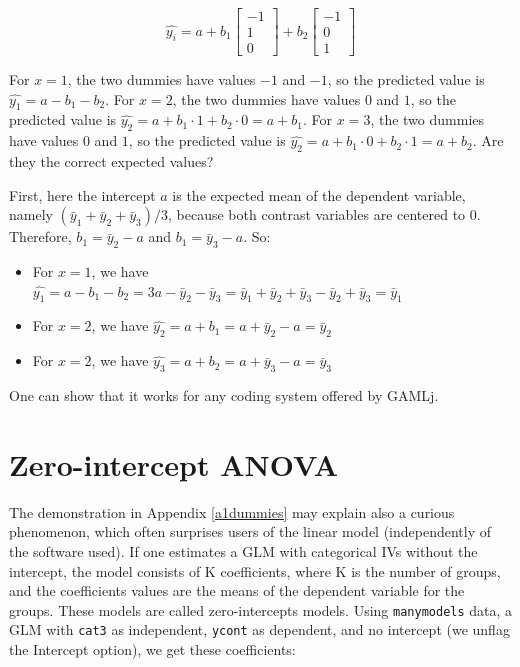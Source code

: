 \documentclass[
]{book}
\providecommand{\tightlist}{%
  \setlength{\itemsep}{0pt}\setlength{\parskip}{0pt}}
\begin{document}
\[
\hat{y_i}=a+b_1 \begin{bmatrix}
-1 \\
1 \\
0
\end{bmatrix} +b_2 \begin{bmatrix}
-1 \\
0 \\
1
\end{bmatrix}
\]

For \(x=1\), the two dummies have values \(-1\) and \(-1\), so the predicted value is \(\hat{y_1}=a-b_1-b_2\). For \(x=2\), the two dummies have values \(0\) and \(1\), so the predicted value is \(\hat{y_2}=a+b_1 \cdot 1 +b_2 \cdot 0 =a+b_1\). For \(x=3\), the two dummies have values \(0\) and \(1\), so the predicted value is \(\hat{y_2}=a+b_1 \cdot 0 +b_2 \cdot 1 =a+b_2\). Are they the correct expected values?

First, here the intercept \(a\) is the expected mean of the dependent variable, namely \((\bar{y}_1+\bar{y}_2+\bar{y}_3)/3\), because both contrast variables are centered to 0. Therefore, \(b_1=\bar{y}_2-a\) and \(b_1=\bar{y}_3-a\). So:

\begin{itemize}
\tightlist
\item
  For \(x=1\), we have \(\hat{y_1}=a-b_1-b_2=3a-\bar{y}_2-\bar{y}_3=\bar{y}_1+\bar{y}_2+\bar{y}_3-\bar{y}_2+\bar{y}_3=\bar{y}_1\)
\item
  For \(x=2\), we have \(\hat{y_2}=a+b_1=a+\bar{y}_2-a=\bar{y}_2\)
\item
  For \(x=2\), we have \(\hat{y_3}=a+b_2=a+\bar{y}_3-a=\bar{y}_3\)
\end{itemize}

One can show that it works for any coding system offered by {GAMLj}.

\hypertarget{zero-intercept-anova}{%
\section{Zero-intercept ANOVA}\label{zero-intercept-anova}}

The demonstration in Appendix \ref{a1dummies} may explain also a curious phenomenon, which often surprises users of the linear model (independently of the software used). If one estimates a GLM with categorical IVs without the intercept, the model consists of K coefficients, where K is the number of groups, and the coefficients values are the means of the dependent variable for the groups. These models are called zero-intercepts models. Using \texttt{manymodels} data, a GLM with \texttt{cat3} as independent, \texttt{ycont} as dependent, and no intercept (we unflag the {Intercept} option), we get these coefficients:
\end{document}
